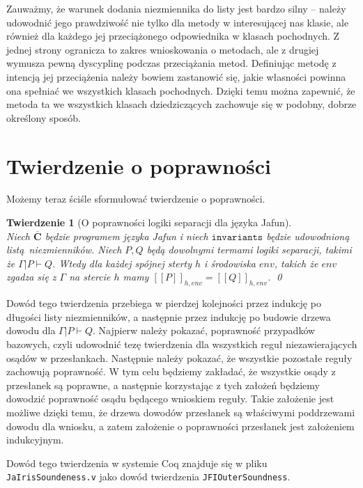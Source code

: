\documentclass[]{pracamgr}
\renewcommand \| {\hspace{0.75em} | \hspace{0.75em} }
\renewcommand \[ {[\![}
\renewcommand \] {]\!]}
\newtheorem{theorem}{Twierdzenie}
\theoremstyle{definition}
\begin{document}
Zauważmy, że warunek dodania niezmiennika do listy jest bardzo silny -- należy udowodnić jego
prawdziwość nie tylko dla metody w interesującej nas klasie, ale również dla każdego jej przeciążonego
odpowiednika w klasach pochodnych. Z jednej strony ogranicza to zakres wnioskowania o metodach,
ale z drugiej wymusza pewną dyscyplinę podczas przeciążania metod.
Definiując metodę z intencją jej przeciążenia należy bowiem zastanowić się, jakie własności
powinna ona spełniać we wszystkich klasach pochodnych.
Dzięki temu można zapewnić, że metoda ta we wszystkich klasach dziedziczących zachowuje się
w podobny, dobrze określony sposób.

\section{Twierdzenie o poprawności}

Możemy teraz ściśle sformułować twierdzenie o poprawności.
\begin{theorem}[O poprawności logiki separacji dla języka Jafun]{\ } \\
  Niech $\overline{\mathbf{C}}$ będzie programem języka Jafun i niech $\mathtt{invariants}$
  będzie udowodnioną listą niezmienników.
  Niech $P, Q$ będą dowolnymi termami logiki separacji, takimi że $\Gamma | P \vdash Q$.
  Wtedy dla każdej spójnej sterty $h$ i środowiska $\mathit{env}$, takich że $\mathit{env}$ zgadza się z $\Gamma$
  na stercie $h$ mamy $\[ P \]_{h, env} = \[ Q \]_{h, env}$.
  \qed
\end{theorem}

Dowód tego twierdzenia przebiega w pierdzej kolejności przez indukcję po
długości listy niezmienników, a następnie przez indukcję po budowie drzewa dowodu
dla $\Gamma | P \vdash Q$.
Najpierw należy pokazać, poprawność przypadków bazowych, czyli udowodnić tezę twierdzenia dla
wszystkich reguł niezawierających osądów w przesłankach.
Następnie należy pokazać, że wszystkie pozostałe reguły zachowują poprawność.
W tym celu będziemy zakładać, że wszystkie osądy z przesłanek są poprawne,
a następnie korzystając z tych założeń będziemy dowodzić poprawność osądu będącego wnioskiem reguły.
Takie założenie jest możliwe dzięki temu, że drzewa dowodów przesłanek są właściwymi poddrzewami
dowodu dla wniosku, a zatem założenie o poprawności przesłanek jest założeniem indukcyjnym.

Dowód tego twierdzenia w systemie Coq znajduje się w pliku \texttt{JaIrisSoundeness.v}
jako dowód twierdzenia \texttt{JFIOuterSoundness}.
\end{document}
